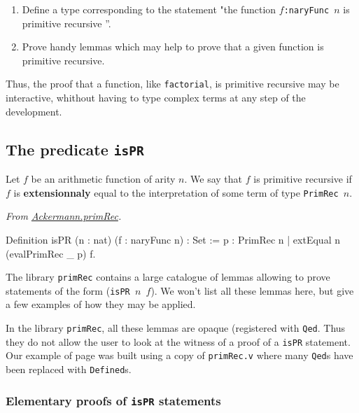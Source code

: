 \begin{enumerate}
\item Define a type corresponding to the statement "the function \texttt{$f$:naryFunc $n$} is primitive recursive ''.
\item Prove handy lemmas which may help to prove that a given function is primitive recursive.
\end{enumerate}

Thus, the proof that a function, like \texttt{factorial}, is primitive recursive may be interactive, whithout having to type complex terms at any step of the development.

\subsection{The predicate \texttt{isPR}}


Let $f$ be an arithmetic function of arity $n$. We say that $f$ is primitive recursive if $f$ is \textbf{extensionnaly}
equal to the interpretation of some term of type \texttt{PrimRec $n$}. 

\vspace{4pt}
\noindent
\emph{From \href{../theories/html/hydras.Ackermann.primRec.html}{Ackermann.primRec}.}
\begin{Coqsrc}
Definition isPR (n : nat) (f : naryFunc n) : Set :=
  {p : PrimRec n | extEqual n (evalPrimRec _ p) f}.  
\end{Coqsrc}

The library \texttt{primRec} contains a large catalogue of lemmas allowing to prove statements 
of the form (\texttt{isPR $n$ $f$}). We won't list all these lemmas here, but give a few examples of
how they may be applied.

\begin{remark}
In the library \texttt{primRec}, all these lemmas are opaque (registered with \texttt{Qed}. Thus they do not allow the user to look at the witness of a proof of a \texttt{isPR} statement. Our example of page\pageref{sect:bigfac} was built using a  copy of \texttt{primRec.v} where many \texttt{Qed}s have been replaced with
\texttt{Defined}s.
\end{remark}

\subsubsection{Elementary proofs of \texttt{isPR} statements}

